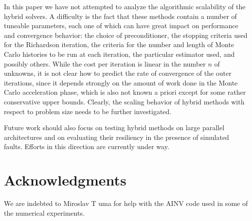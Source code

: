 \documentclass[final,leqno,onefignum,onetabnum]{siamltex1213}
\begin{document}
In this paper we have not attempted to analyze the algorithmic scalability
of the hybrid solvers. A difficulty is the fact that these methods contain
a number of tuneable parameters, each one of which can have great impact on
performance and convergence behavior:
the choice of preconditioner, the stopping
criteria used for the Richardson iteration, the criteria for the number
and length of Monte Carlo histories to be run at each iteration, the
particular estimator used, and
possibly others. While the cost per iteration is linear in the
number $n$ of unknowns, it is not clear how to predict the rate of convergence of
the outer iterations, since it depends strongly on the amount of work
done in the Monte Carlo acceleration phase, which is also not known a
priori except for some rather conservative upper bounds. Clearly,
the scaling behavior of hybrid methods with respect to problem size
needs to be further investigated.

Future work should also focus on testing hybrid methods on
large parallel architectures and on evaluating their resiliency in the presence
of simulated faults. Efforts in this direction are currently under way.

\section*{Acknowledgments}
We are indebted to Miroslav T uma for help with the AINV code used
in some of the numerical experiments.
\end{document}
